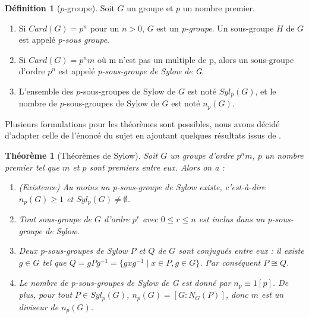 \documentclass{article}
\theoremstyle{definition}
\newtheorem{definition}[subsubsection]{Définition}
\theoremstyle{plain}
\newtheorem{theorem}[subsubsection]{Théorème}
\theoremstyle{plain}
\theoremstyle{plain}
\theoremstyle{plain}
\theoremstyle{definition}
\theoremstyle{plain}
\theoremstyle{plain}
\begin{document}
\begin{definition}[\ensuremath{p}-groupe]
	Soit \( G \) un groupe et \( p \) un nombre premier.
	\begin{enumerate}[label = (\roman*)]
	\item Si \( Card(G) = p^{n} \) pour un \( n > 0 \), \( G \) est un \textit{p-groupe}. Un sous-groupe \( H \) de \( G \) est appelé \textit{p-sous groupe}.
	\item Si \( Card(G) = p^{n}m \) où m n'est pas un multiple de p, alors un sous-groupe d'ordre \( p^{n} \) est appelé \textit{p-sous-groupe de Sylow de G}.
	\item L'ensemble des \(p\)-sous-groupes de Sylow de \( G \) est noté \( Syl_{p}(G) \), et le nombre de \(p\)-sous-groupes de Sylow de \( G \) est noté \( n_{p}(G) \).
	\end{enumerate}
\end{definition}

Plusieurs formulations pour les théorèmes sont possibles, nous avons décidé d'adapter celle de l'énoncé du sujet en ajoutant quelques résultats issus de \cite[p.~215]{chen2024napkin}.

\begin{theorem}[Théorèmes de Sylow]\label{theorem:S}
	Soit \( G \) un groupe d'ordre \( p^{n}m \), \( p \) un nombre premier tel que \( m \) et \( p \) sont premiers entre eux. Alors on a :
	\begin{enumerate}[label={\upshape(\roman*)}]
		\item (Existence) Au moins un p-sous-groupe de Sylow existe, c'est-à-dire \( n_{p}(G) \geq 1 \) et \( Syl_{p}(G) \neq \emptyset \).\label{S1}
		\item Tout sous-groupe de \( G \) d'ordre \( p^{r} \) avec \( 0 \leq r \leq n \) est inclus dans un p-sous-groupe de Sylow. \label{S2}
		\item Deux p-sous-groupes de Sylow \( P \) et \( Q \) de \( G \) sont conjugués entre eux : il existe \( g \in G \) tel que \( Q = gPg^{-1} = \{ gxg^{-1} \mid x \in P, g \in G \} \). Par conséquent \( P \cong Q \).\label{S3}
		\item Le nombre de p-sous-groupes de Sylow de G est donné par \( n_{p} \equiv 1 [p] \). De plus, pour tout \( P \in Syl_{p}({G}) \), \( n_{p}({G}) = [G : N_{G}({P}) ] \), donc \( m \) est un diviseur de \( n_p({G}) \).\label{S4}
	\end{enumerate}

\end{theorem}
\end{document}

